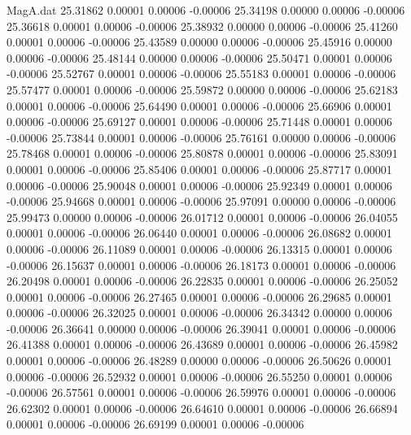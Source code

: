 \begin{filecontents}{MagA.dat}
  25.31862    0.00001    0.00006   -0.00006
  25.34198    0.00000    0.00006   -0.00006
  25.36618    0.00001    0.00006   -0.00006
  25.38932    0.00000    0.00006   -0.00006
  25.41260    0.00001    0.00006   -0.00006
  25.43589    0.00000    0.00006   -0.00006
  25.45916    0.00000    0.00006   -0.00006
  25.48144    0.00000    0.00006   -0.00006
  25.50471    0.00001    0.00006   -0.00006
  25.52767    0.00001    0.00006   -0.00006
  25.55183    0.00001    0.00006   -0.00006
  25.57477    0.00001    0.00006   -0.00006
  25.59872    0.00000    0.00006   -0.00006
  25.62183    0.00001    0.00006   -0.00006
  25.64490    0.00001    0.00006   -0.00006
  25.66906    0.00001    0.00006   -0.00006
  25.69127    0.00001    0.00006   -0.00006
  25.71448    0.00001    0.00006   -0.00006
  25.73844    0.00001    0.00006   -0.00006
  25.76161    0.00000    0.00006   -0.00006
  25.78468    0.00001    0.00006   -0.00006
  25.80878    0.00001    0.00006   -0.00006
  25.83091    0.00001    0.00006   -0.00006
  25.85406    0.00001    0.00006   -0.00006
  25.87717    0.00001    0.00006   -0.00006
  25.90048    0.00001    0.00006   -0.00006
  25.92349    0.00001    0.00006   -0.00006
  25.94668    0.00001    0.00006   -0.00006
  25.97091    0.00000    0.00006   -0.00006
  25.99473    0.00000    0.00006   -0.00006
  26.01712    0.00001    0.00006   -0.00006
  26.04055    0.00001    0.00006   -0.00006
  26.06440    0.00001    0.00006   -0.00006
  26.08682    0.00001    0.00006   -0.00006
  26.11089    0.00001    0.00006   -0.00006
  26.13315    0.00001    0.00006   -0.00006
  26.15637    0.00001    0.00006   -0.00006
  26.18173    0.00001    0.00006   -0.00006
  26.20498    0.00001    0.00006   -0.00006
  26.22835    0.00001    0.00006   -0.00006
  26.25052    0.00001    0.00006   -0.00006
  26.27465    0.00001    0.00006   -0.00006
  26.29685    0.00001    0.00006   -0.00006
  26.32025    0.00001    0.00006   -0.00006
  26.34342    0.00000    0.00006   -0.00006
  26.36641    0.00000    0.00006   -0.00006
  26.39041    0.00001    0.00006   -0.00006
  26.41388    0.00001    0.00006   -0.00006
  26.43689    0.00001    0.00006   -0.00006
  26.45982    0.00001    0.00006   -0.00006
  26.48289    0.00000    0.00006   -0.00006
  26.50626    0.00001    0.00006   -0.00006
  26.52932    0.00001    0.00006   -0.00006
  26.55250    0.00001    0.00006   -0.00006
  26.57561    0.00001    0.00006   -0.00006
  26.59976    0.00001    0.00006   -0.00006
  26.62302    0.00001    0.00006   -0.00006
  26.64610    0.00001    0.00006   -0.00006
  26.66894    0.00001    0.00006   -0.00006
  26.69199    0.00001    0.00006   -0.00006

\end{filecontents}
